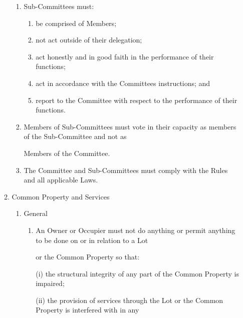 \documentclass{article}
\begin{document}
\begin{enumerate}[label=\arabic*.]
\begin{enumerate}[label=\arabic{enumi}.\arabic*.]
\begin{enumerate}[label=(\arabic*)]
\item {\fontsize{9.962}{1} Sub-Committees must: }

\begin{enumerate}[label=(\alph*)]
\item {\fontsize{9.962}{1} be comprised of Members; }

\item {\fontsize{9.962}{1} not act outside of their delegation; }

\item {\fontsize{9.962}{1} act honestly and in good faith in the performance of their functions; }

\item {\fontsize{9.962}{1} act in accordance with the Committees instructions; and }

\item {\fontsize{9.962}{1} report to the Committee with respect to the performance of their functions. }

\end{enumerate}
\item {\fontsize{9.962}{1} Members of Sub-Committees must vote in their capacity as members of the Sub-Committee and not as }

{\fontsize{10.02}{1}Members of the Committee. }

\item {\fontsize{9.962}{1} The Committee and Sub-Committees must comply with the Rules and all applicable Laws. }

\end{enumerate}
\item {\fontsize{9.99}{1} Common Property and Services }

\begin{enumerate}[label=(\arabic*)]
\item {\fontsize{9.962}{1} General }

\begin{enumerate}[label=(\alph*)]
\item {\fontsize{9.962}{1} An Owner or Occupier must not do anything or permit anything to be done on or in relation to a Lot }

{\fontsize{10.02}{1}or the Common Property so that: }

{\fontsize{9.962}{1}(i) the structural integrity of any part of the Common Property is impaired; }

{\fontsize{9.962}{1}(ii) the provision of services through the Lot or the Common Property is interfered with in any }


\end{enumerate}
\end{enumerate}
\end{enumerate}
\end{enumerate}
\end{document}
